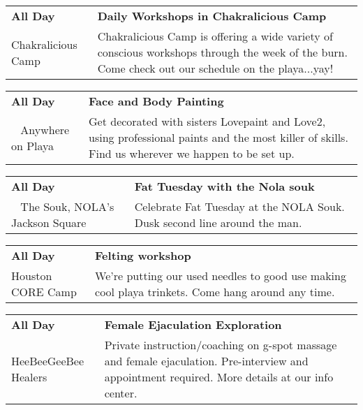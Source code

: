 \begin{tabular}{ p{1in} p{2.2in} }
    \textbf{All Day} & \textbf{Daily Workshops in Chakralicious Camp} \\
    Chakralicious Camp \newline  & Chakralicious Camp is offering a wide variety of conscious workshops through the week of the burn. Come check out our schedule on the playa...yay! \\
    \hline 
\end{tabular}
    
\begin{tabular}{ p{1in} p{2.2in} }
    \textbf{All Day} & \textbf{Face and Body Painting} \\
    ~ \newline Anywhere on Playa & Get decorated with sisters Lovepaint and Love2, using professional paints and the most killer of skills. Find us wherever we happen to be set up. \\
    \hline 
\end{tabular}
    
\begin{tabular}{ p{1in} p{2.2in} }
    \textbf{All Day} & \textbf{Fat Tuesday with the Nola souk} \\
    ~ \newline The Souk, NOLA's Jackson Square  & Celebrate Fat Tuesday at the NOLA Souk. Dusk second line around the man. \\
    \hline 
\end{tabular}
    
\begin{tabular}{ p{1in} p{2.2in} }
    \textbf{All Day} & \textbf{Felting workshop} \\
    Houston CORE Camp \newline  & We're putting our used needles to good use making cool playa trinkets. Come hang around any time. \\
    \hline 
\end{tabular}
    
\begin{tabular}{ p{1in} p{2.2in} }
    \textbf{All Day} & \textbf{Female Ejaculation Exploration} \\
    HeeBeeGeeBee Healers \newline  & Private instruction/coaching on g-spot massage and female ejaculation.  Pre-interview and appointment required.  More details at our info center. \\
    \hline 
\end{tabular}
    
